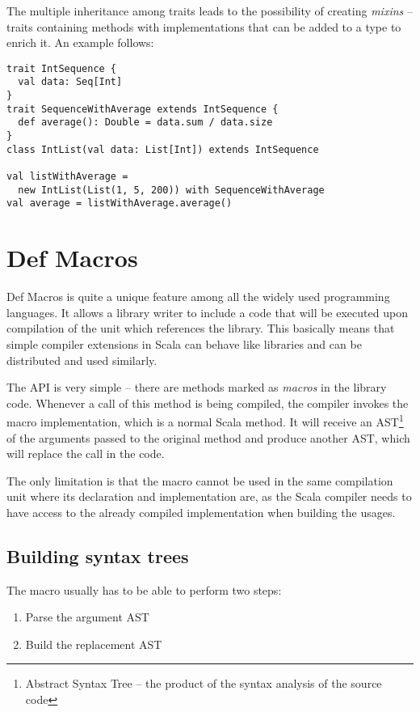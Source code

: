 The multiple inheritance among traits leads to the possibility of creating \textit{mixins} -- traits containing methods with implementations that can be added to a type to enrich it. An example follows:

\lstset{style=Scala}
\begin{lstlisting}
trait IntSequence {
  val data: Seq[Int]
}
trait SequenceWithAverage extends IntSequence {
  def average(): Double = data.sum / data.size
}
class IntList(val data: List[Int]) extends IntSequence

val listWithAverage = 
  new IntList(List(1, 5, 200)) with SequenceWithAverage
val average = listWithAverage.average()
\end{lstlisting}

\section{Def Macros}
\label{sec:defmacros}

Def Macros is quite a unique feature among all the widely used programming languages. It allows a library writer to include a code that will be executed upon compilation of the unit which references the library. This basically means that simple compiler extensions in Scala can behave like libraries and can be distributed and used similarly.

The API is very simple -- there are methods marked as \textit{macros} in the library code. Whenever a call of this method is being compiled, the compiler invokes the macro implementation, which is a normal Scala method. It will receive an AST\footnote{Abstract Syntax Tree -- the product of the syntax analysis of the source code} of the arguments passed to the original method and produce another AST, which will replace the call in the code.


The only limitation is that the macro cannot be used in the same compilation unit where its declaration and implementation are, as the Scala compiler needs to have access to the already compiled implementation when building the usages.

\subsection{Building syntax trees}
\label{subsec:buildingast}

The macro usually has to be able to perform two steps:

\begin{enumerate}
	\item Parse the argument AST
	\item Build the replacement AST
\end{enumerate}

